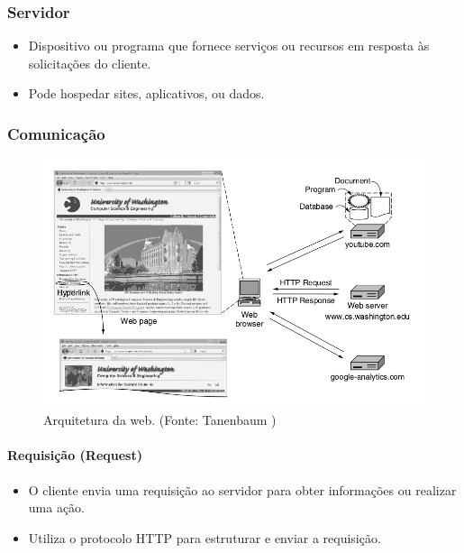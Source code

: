 \documentclass{article}
\begin{document}
\subsubsection{Servidor}

\begin{itemize}
    \item Dispositivo ou programa que fornece serviços ou recursos em resposta às
          solicitações do cliente.
    \item Pode hospedar sites, aplicativos, ou dados.
\end{itemize}

\subsubsection{Comunicação}

\begin{figure}[H]
    \centering
    \includegraphics[width=\textwidth]{./assets/3510.png}
    \caption{Arquitetura da web. (Fonte: Tanenbaum \cite{tanenbaum})}
\end{figure}

\paragraph{Requisição (Request)}

\begin{itemize}
    \item O cliente envia uma requisição ao servidor para obter informações ou realizar
          uma ação.
    \item Utiliza o protocolo HTTP para estruturar e enviar a requisição.
\end{itemize}
\end{document}
